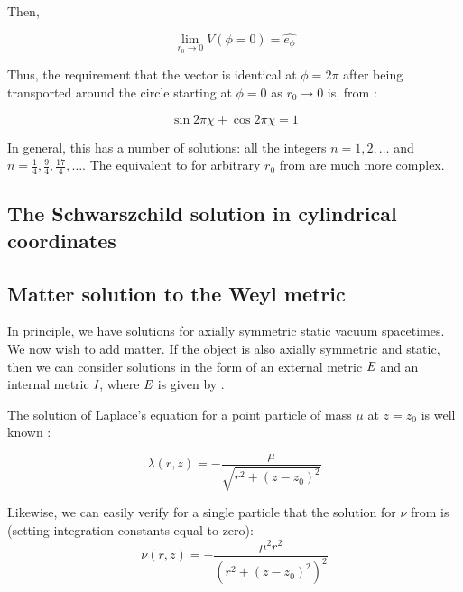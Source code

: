 \documentclass{article}
\begin{document}
Then,

\begin{equation}
  \label{eq:lim-0}
  \lim_{{r_0}\rightarrow 0} V\left(\phi=0\right)=\hat{e_{\phi}}
\end{equation}

Thus, the requirement that the vector is identical at $\phi=2\pi$
after being transported around the circle starting at $\phi=0$ as
$r_0\rightarrow 0$ is, from :

\begin{equation}
  \label{eq:lim-2-pi}
  \sin 2\pi\chi + \cos 2\pi\chi = 1
\end{equation}

In general, this has a number of solutions: all the integers
$n=1,2,\ldots$ and $n=\frac{1}{4}, \frac{9}{4}, \frac{17}{4},
\ldots$. The equivalent to  for
arbitrary $r_0$ from  are much more
complex.

\subsection{The Schwarszchild solution in cylindrical coordinates}

\subsection{Matter solution to the Weyl metric}

In principle, we have solutions for axially symmetric static vacuum spacetimes. We now wish to add matter. If the object is also axially symmetric and static, then we can consider solutions in the form of an external metric $\emph{E}$ and an internal metric $\emph{I}$, where $\emph{E}$ is given by .

The solution of Laplace's equation for a point particle of mass $\mu$ at
$z=z_{0}$ is well known \cite{letelier1997superposition}:

\begin{equation}
\lambda (r,z)=-\frac{\mu}{\sqrt{r^{2}+\left(z-z_{0}\right)^{2}}}\label{eq:1-m}
\end{equation}

Likewise, we can easily verify for a single particle that the solution
for $\nu$ from  is (setting integration constants equal to zero):
\begin{equation}
\nu (r,z)=-\frac{\mu^{2}r^{2}}{\left(r^{2}+\left(z-z_{0}\right)^{2}\right)^{2}}
\end{equation}
\end{document}
